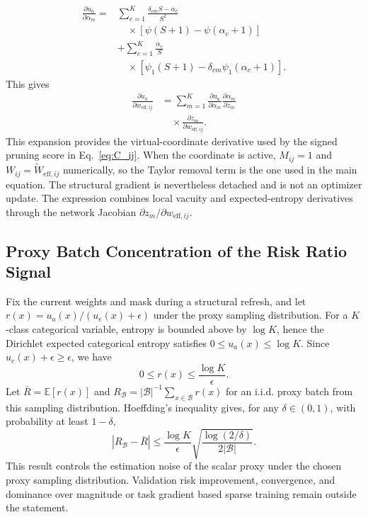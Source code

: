 \documentclass[letterpaper]{article}
\begin{document}
\begin{equation}
\begin{aligned}
    \frac{\partial u_a}{\partial\alpha_m}
    ={}&\sum_{c=1}^{K}\frac{\delta_{cm}S-\alpha_c}{S^2}\\
    &\quad\times\left[\psi(S+1)-\psi(\alpha_c+1)\right]\\
    &+\sum_{c=1}^{K}\frac{\alpha_c}{S}\\
    &\quad\times\left[\psi_1(S+1)-\delta_{cm}\psi_1(\alpha_c+1)\right].
\end{aligned}
\end{equation}
This gives
\begin{equation}
\begin{aligned}
    \frac{\partial u_a}{\partial w_{\mathrm{eff},ij}}
    &=\sum_{m=1}^{K}
    \frac{\partial u_a}{\partial\alpha_m}
    \frac{\partial\alpha_m}{\partial z_m}\\
    &\quad\times\frac{\partial z_m}{\partial w_{\mathrm{eff},ij}}.
\end{aligned}
\end{equation}
This expansion provides the virtual-coordinate derivative used by the signed pruning score in Eq.~\ref{eq:C_ij}. When the coordinate is active, $M_{ij}=1$ and $W_{ij}=\widetilde W_{\text{eff},ij}$ numerically, so the Taylor removal term is the one used in the main equation. The structural gradient is nevertheless detached and is not an optimizer update. The expression combines local vacuity and expected-entropy derivatives through the network Jacobian $\partial z_m/\partial w_{\text{eff},ij}$.

\subsection{Proxy Batch Concentration of the Risk Ratio Signal}
\label{app:proxy_concentration}
Fix the current weights and mask during a structural refresh, and let
$r(x)=u_a(x)/(u_e(x)+\epsilon)$ under the proxy sampling distribution.
For a $K$-class categorical variable, entropy is bounded above by
$\log K$, hence the Dirichlet expected categorical entropy satisfies
$0\le u_a(x)\le\log K$. Since $u_e(x)+\epsilon\ge\epsilon$, we have
\[
    0\le r(x)\le \frac{\log K}{\epsilon}.
\]
Let $\bar R=\mathbb{E}[r(x)]$ and
$R_{\mathcal B}=|\mathcal B|^{-1}\sum_{x\in\mathcal B}r(x)$ for an
i.i.d. proxy batch from this sampling distribution. Hoeffding's
inequality gives, for any $\delta\in(0,1)$, with probability at least
$1-\delta$,
\[
    |R_{\mathcal B}-\bar R|
    \le
    \frac{\log K}{\epsilon}
    \sqrt{\frac{\log(2/\delta)}{2|\mathcal B|}}.
\]
This result controls the estimation noise of the scalar proxy under the chosen
proxy sampling distribution. Validation risk improvement, convergence, and
dominance over magnitude or task gradient based sparse training remain outside
the statement.
\end{document}
